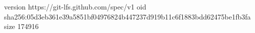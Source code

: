 version https://git-lfs.github.com/spec/v1
oid sha256:05d3eb361e39a5851bf04976824b447237d919b11c6f1883bdd62475be1fb3fa
size 174916
